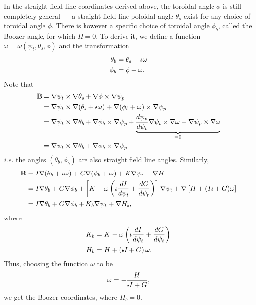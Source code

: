 In the straight field line coordinates derived above, the toroidal angle $\phi$ is still completely general --- a straight field line poloidal angle $\theta_s$ exist for any choice of toroidal angle $\phi$. There is however a specific choice of toroidal angle $\phi_b$, called the Boozer angle, for which $H=0$. To derive it, we define a function $\omega=\omega(\psi_t,\theta_s,\phi)$ and the transformation
\begin{align}
	\theta_b &= \theta_s -\text{$\iota\!\!$-}\omega\\
	\phi_b &= \phi - \omega.
\end{align}
Note that
\begin{align}
	\mathbf{B} &= \nabla\psi_t\times\nabla\theta_s + \nabla\phi\times\nabla\psi_p\\
	&= \nabla\psi_t\times\nabla(\theta_b+\text{$\iota\!\!$-}\omega) + \nabla(\phi_b+\omega)\times\nabla\psi_p\\
	&= \nabla\psi_t\times\nabla\theta_b + \nabla\phi_b\times\nabla\psi_p + \underbrace{\frac{d\psi_p}{d\psi_t}\nabla\psi_t\times\nabla\omega - \nabla\psi_p\times\nabla\omega}_{=0}\\
	&= \nabla\psi_t\times\nabla\theta_b + \nabla\phi_b\times\nabla\psi_p,
\end{align}
\textit{i.e.} the angles $(\theta_b,\phi_b)$ are also straight field line angles. Similarly, 
\begin{align}
	\mathbf{B} &= I\nabla(\theta_b+\text{$\iota\!\!$-}\omega) + G\nabla(\phi_b+\omega) + K \nabla\psi_t + \nabla H\\
	&= I\nabla\theta_b + G\nabla\phi_b + \left[K-\omega\left(\text{$\iota\!\!$-}\frac{dI}{d\psi_t}+\frac{dG}{d\psi_t}\right)\right]\nabla\psi_t + \nabla\left[H+(I\text{$\iota\!\!$-}+G)\omega\right]\\
	&= I\nabla\theta_b + G\nabla\phi_b + K_b\nabla\psi_t + \nabla H_b,
\end{align}
where 
\begin{align}
	K_b &= K-\omega\left(\text{$\iota\!\!$-}\frac{dI}{d\psi_t}+\frac{dG}{d\psi_t}\right)\\
	H_b &= H + \left(\text{$\iota\!\!$-} I + G\right) \omega.
\end{align}
Thus, choosing the function $\omega$ to be 
\begin{equation}
	\omega = -\frac{H}{\text{$\iota\!\!$-} I + G},
\end{equation}
we get the Boozer coordinates, where $H_b = 0$.




